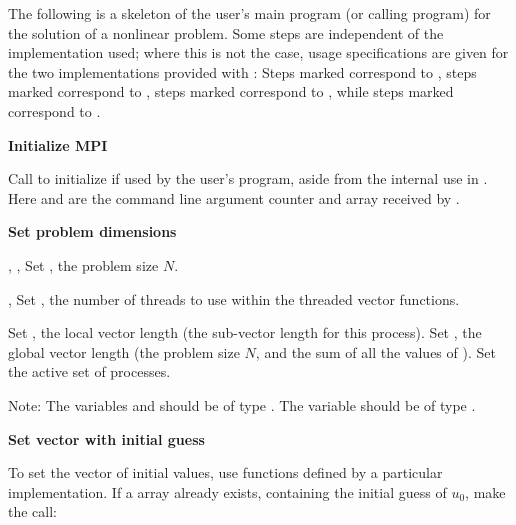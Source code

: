 The following is a skeleton of the user's main program (or calling
program) for the solution of a nonlinear problem. 
Some steps are independent of the {\nvector} implementation used; 
where this is not the case, usage specifications are given for the two implementations 
provided with {\kinsol}: Steps marked {\p} correspond to 
{\nvecp}, steps marked {\omp} correspond to {\nvecopenmp}, steps
marked {\pt} correspond to {\nvecpthreads}, while steps marked {\s}
correspond to {\nvecs}.
\begin{Steps}
  
\item 
  {\bf {\p} Initialize MPI}

  Call  to initialize {\mpi} if used by
  the user's program, aside from the internal use in {\nvecp}.  
  Here  and  are the command line argument 
  counter and array received by .
  
\item
  {\bf Set problem dimensions}

  {\s, \omp, \pt} Set , the problem size $N$.

  {\omp, \pt} Set , the number of threads to use within
  the threaded vector functions.

  {\p} Set , the local vector length (the sub-vector length for this process).
  Set , the global vector length (the problem size $N$, and the sum of all the
  values of ).  Set the active set of processes.

  Note: The variables  and  should be of type
  .  The variable  should be of type .

\item
  {\bf Set vector with initial guess}
 
  To set the vector  of initial values, use functions defined by a
  particular {\nvector} implementation.  If a  array  
  already exists, containing the initial guess of $u_0$, make the call:

  {\s} 

  {\omp} 

  {\pt} 

  {\p} 


\end{Steps}
